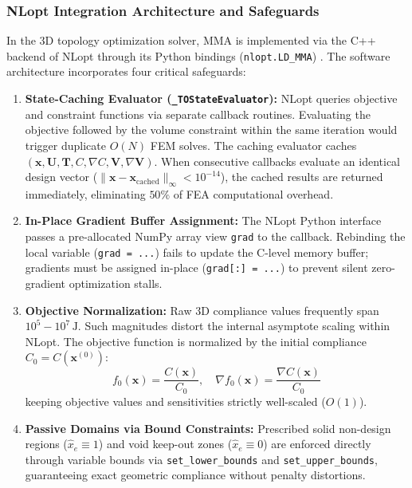 \documentclass[11pt, a4paper]{article}
\begin{document}
\subsubsection{NLopt Integration Architecture and Safeguards}
In the 3D topology optimization solver, MMA is implemented via the C++ backend of NLopt through its Python bindings (\texttt{nlopt.LD\_MMA}) \cite{johnson2014}. The software architecture incorporates four critical safeguards:
\begin{enumerate}
    \item \textbf{State-Caching Evaluator (\texttt{\_TOStateEvaluator}):} NLopt queries objective and constraint functions via separate callback routines. Evaluating the objective followed by the volume constraint within the same iteration would trigger duplicate $O(N)$ FEM solves. The caching evaluator caches $(\mathbf{x}, \mathbf{U}, \mathbf{T}, C, \nabla C, \mathbf{V}, \nabla \mathbf{V})$. When consecutive callbacks evaluate an identical design vector ($\|\mathbf{x} - \mathbf{x}_{\text{cached}}\|_\infty < 10^{-14}$), the cached results are returned immediately, eliminating $50\%$ of FEA computational overhead.
    \item \textbf{In-Place Gradient Buffer Assignment:} The NLopt Python interface passes a pre-allocated NumPy array view \texttt{grad} to the callback. Rebinding the local variable (\texttt{grad = ...}) fails to update the C-level memory buffer; gradients must be assigned in-place (\texttt{grad[:] = ...}) to prevent silent zero-gradient optimization stalls.
    \item \textbf{Objective Normalization:} Raw 3D compliance values frequently span $10^5 - 10^7\,\text{J}$. Such magnitudes distort the internal asymptote scaling within NLopt. The objective function is normalized by the initial compliance $C_0 = C(\mathbf{x}^{(0)})$:
    \begin{equation}
    f_0(\mathbf{x}) = \frac{C(\mathbf{x})}{C_0}, \quad \nabla f_0(\mathbf{x}) = \frac{\nabla C(\mathbf{x})}{C_0}
    \end{equation}
    keeping objective values and sensitivities strictly well-scaled ($O(1)$).
    \item \textbf{Passive Domains via Bound Constraints:} Prescribed solid non-design regions ($\hat{x}_e \equiv 1$) and void keep-out zones ($\hat{x}_e \equiv 0$) are enforced directly through variable bounds via \texttt{set\_lower\_bounds} and \texttt{set\_upper\_bounds}, guaranteeing exact geometric compliance without penalty distortions.
\end{enumerate}
\end{document}
